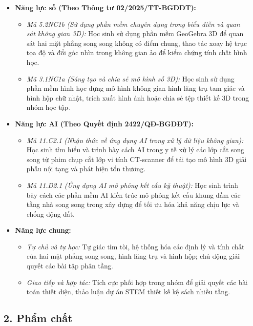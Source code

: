 \documentclass[12pt, a4paper]{article}
\begin{document}
\begin{itemize}[leftmargin=1.2cm]
    \item \textbf{Năng lực số (Theo Thông tư 02/2025/TT-BGDĐT):}
    \begin{itemize}[leftmargin=0.6cm]
        \item \textit{Mã 5.2NC1b (Sử dụng phần mềm chuyên dụng trong biểu diễn và quan sát không gian 3D):} Học sinh sử dụng phần mềm GeoGebra 3D để quan sát hai mặt phẳng song song không có điểm chung, thao tác xoay hệ trục tọa độ và đổi góc nhìn trong không gian ảo để kiểm chứng tính chất hình học.
        \item \textit{Mã 3.1NC1a (Sáng tạo và chia sẻ mô hình số 3D):} Học sinh sử dụng phần mềm hình học dựng mô hình không gian hình lăng trụ tam giác và hình hộp chữ nhật, trích xuất hình ảnh hoặc chia sẻ tệp thiết kế 3D trong nhóm học tập.
    \end{itemize}

    \item \textbf{Năng lực AI (Theo Quyết định 2422/QĐ-BGDĐT):}
    \begin{itemize}[leftmargin=0.6cm]
        \item \textit{Mã 11.C2.1 (Nhận thức về ứng dụng AI trong xử lý dữ liệu không gian):} Học sinh tìm hiểu và trình bày cách AI trong y tế xử lý các lớp cắt song song từ phim chụp cắt lớp vi tính CT-scanner để tái tạo mô hình 3D giải phẫu nội tạng và phát hiện tổn thương.
        \item \textit{Mã 11.D2.1 (Ứng dụng AI mô phỏng kết cấu kỹ thuật):} Học sinh trình bày cách các phần mềm AI kiến trúc mô phỏng kết cấu khung dầm các tầng nhà song song trong xây dựng để tối ưu hóa khả năng chịu lực và chống động đất.
    \end{itemize}

    \item \textbf{Năng lực chung:}
    \begin{itemize}[leftmargin=0.6cm]
        \item \textit{Tự chủ và tự học:} Tự giác tìm tòi, hệ thống hóa các định lý và tính chất của hai mặt phẳng song song, hình lăng trụ và hình hộp; chủ động giải quyết các bài tập phân tầng.
        \item \textit{Giao tiếp và hợp tác:} Tích cực phối hợp trong nhóm để giải quyết các bài toán thiết diện, thảo luận dự án STEM thiết kế kệ sách nhiều tầng.
    \end{itemize}
\end{itemize}

\subsection*{2. Phẩm chất}
\end{document}
